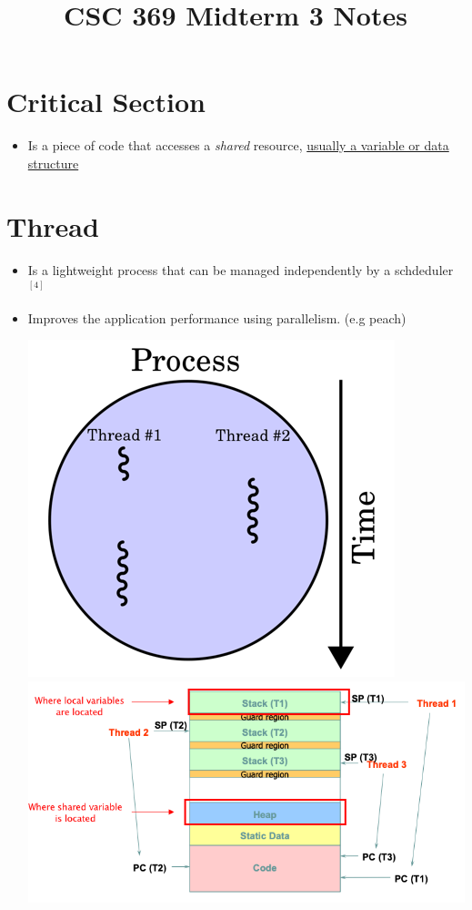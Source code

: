 \documentclass[12pt]{article}
\begin{document}
\title{CSC 369 Midterm 3 Notes}

\section{Critical Section}

\begin{itemize}
    \item Is a piece of code that accesses a \textit{shared} resource,
    \ul{usually a variable or data structure}
\end{itemize}

\section{Thread}

\begin{itemize}
    \item Is a lightweight process that can be managed independently by a schdeduler $^{[4]}$
    \item Improves the application performance using parallelism. (e.g peach)

    \begin{center}
    \includegraphics[width=0.4\linewidth]{../images/midterm_2_solution_1.png}
    \includegraphics[width=\linewidth]{../images/midterm_2_solution_2.png}
    \end{center}


\end{itemize}
\end{document}
